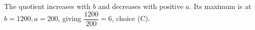 The quotient increases with $b$ and decreases with positive $a$. Its maximum is at $b=1200,a=200$, giving $\dfrac{1200}{200}=\boxed6$, choice (C).
